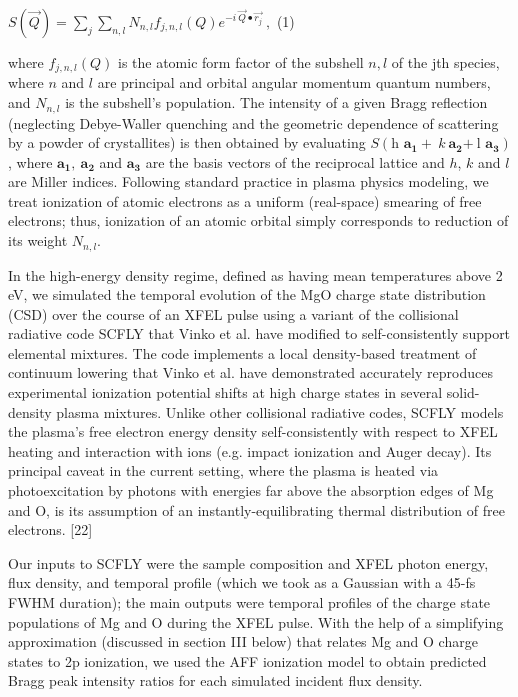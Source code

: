 \(S\left( \overrightarrow{Q} \right) = \sum_{j}^{}{\sum_{n,l}N_{n,l}f_{j,n,l}\left( Q \right)e^{- i\ \overrightarrow{Q} \bullet \overrightarrow{r_{j}}}\ },\)
(1)

where \(f_{j,n,l}\left( Q \right)\) is the atomic form factor of the
subshell \(n,l\) of the jth species, where \(n\) and \(l\) are principal
and orbital angular momentum quantum numbers, and \(N_{n,l}\) is the
subshell's population. The intensity of a given Bragg reflection
(neglecting Debye-Waller quenching and the geometric dependence of
scattering by a powder of crystallites) is then obtained by evaluating
\(S\left( \text{h\ }\mathbf{a}_{\mathbf{1}} + \ k\ \mathbf{a}_{\mathbf{2}}\mathbf{+ \ }\text{l\ }\mathbf{a}_{\mathbf{3}} \right)\),
where \(\mathbf{a}_{\mathbf{1}}\mathbf{,\ }\mathbf{a}_{\mathbf{2}}\) and
\(\mathbf{a}_{\mathbf{3}}\) are the basis vectors of the reciprocal
lattice and \(h\), \(k\) and \(l\) are Miller indices. Following
standard practice in plasma physics modeling, we treat ionization of
atomic electrons as a uniform (real-space) smearing of free electrons;
thus, ionization of an atomic orbital simply corresponds to reduction of
its weight \(N_{n,l}\).

In the high-energy density regime, defined as having mean temperatures
above 2 eV, we simulated the temporal evolution of the MgO charge state
distribution (CSD) over the course of an XFEL pulse using a variant of
the collisional radiative code SCFLY that Vinko et al. have modified to
self-consistently support elemental mixtures. \cite{ciricosta2016measurements} The code
implements a local density-based treatment of continuum lowering that
Vinko et al. have demonstrated accurately reproduces experimental
ionization potential shifts at high charge states in several
solid-density plasma mixtures. Unlike other collisional radiative codes,
SCFLY models the plasma's free electron energy density self-consistently
with respect to XFEL heating and interaction with ions (e.g. impact
ionization and Auger decay). Its principal caveat in the current
setting, where the plasma is heated via photoexcitation by photons with
energies far above the absorption edges of Mg and O, is its assumption
of an instantly-equilibrating thermal distribution of free electrons.
{[}22{]}

Our inputs to SCFLY were the sample composition and XFEL photon energy,
flux density, and temporal profile (which we took as a Gaussian with a
45-fs FWHM duration); the main outputs were temporal profiles of the
charge state populations of Mg and O during the XFEL pulse. With the
help of a simplifying approximation (discussed in section III below)
that relates Mg and O charge states to 2p ionization, we used the AFF
ionization model to obtain predicted Bragg peak intensity ratios for
each simulated incident flux density.

